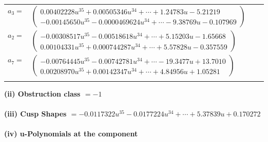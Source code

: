 \documentclass[1p]{elsarticle_modified}
\theoremstyle{definition}
\begin{document}
\begin{tabular}{m{7pt} m{180pt} m{7pt} m{180pt} }
\flushright $a_{3}=$&$\begin{pmatrix}0.00402228 u^{35}+0.00505346 u^{34}+\cdots+1.24783 u-5.21219\\-0.00145650 u^{35}-0.0000469624 u^{34}+\cdots-9.38769 u-0.107969\end{pmatrix}$ \\
\flushright $a_{2}=$&$\begin{pmatrix}-0.00308517 u^{35}-0.00518618 u^{34}+\cdots+5.15203 u-1.65668\\0.00104331 u^{35}+0.000744287 u^{34}+\cdots+5.57828 u-0.357559\end{pmatrix}$ \\
\flushright $a_{7}=$&$\begin{pmatrix}-0.00764445 u^{35}-0.00742781 u^{34}+\cdots-19.3477 u+13.7010\\0.00208970 u^{35}+0.00142347 u^{34}+\cdots+4.84956 u+1.05281\end{pmatrix}$\\&\end{tabular}
\flushleft \textbf{(ii) Obstruction class $= -1$}\\~\\
\flushleft \textbf{(iii) Cusp Shapes $= -0.0117322 u^{35}-0.0177224 u^{34}+\cdots+5.37839 u+0.170272$}\\~\\
\newpage\renewcommand{\arraystretch}{1}
\flushleft \textbf{(iv) u-Polynomials at the component}\newline \\
\end{document}
